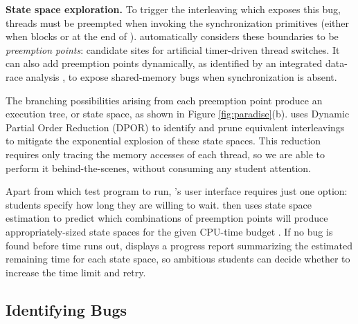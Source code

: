 {\bf State space exploration.}
To trigger the interleaving which exposes this bug, threads must be preempted when invoking the synchronization primitives (either when  blocks or at the end of ).
\landslide automatically considers these boundaries to be {\em preemption points}:
candidate sites for artificial timer-driven thread switches.
It can also add preemption points dynamically,
as identified by an integrated data-race analysis \cite{hybriddatarace,fasttrack},
to expose shared-memory bugs when synchronization is absent.

The branching possibilities arising from each preemption point produce an execution tree, or state space,
as shown in Figure \ref{fig:paradise}(b).
\landslide uses Dynamic Partial Order Reduction (DPOR) \cite{dpor} to identify and prune equivalent interleavings
to mitigate the exponential explosion of these state spaces.
This reduction requires only tracing the memory accesses of each thread,
so we are able to perform it behind-the-scenes, without consuming any student attention.

Apart from which test program to run, \landslide's user interface requires just one option:
students specify how long they are willing to wait.
\landslide then uses state space estimation \cite{estimation-anonymized} to predict
which combinations of preemption points will produce appropriately-sized state spaces for the given CPU-time budget \cite{quicksand-anonymized}.
If no bug is found before time runs out, \landslide displays a progress report summarizing the estimated remaining time for each state space,
so ambitious students can decide whether to increase the time limit and retry.

\subsection{Identifying Bugs}

\newcommand\hilight[2]{\color{#1}#2\color{black}\xspace}

